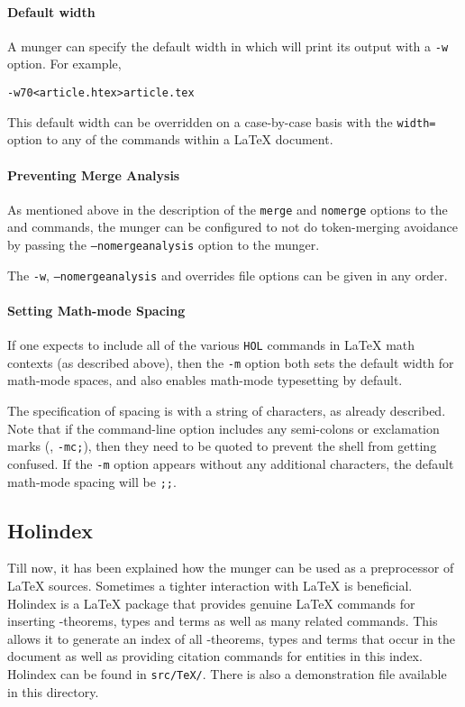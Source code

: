 \paragraph{Default width}
A munger can specify the default width in which \HOL{} will print its
output with a \texttt{-w} option.
%
For example,
\begin{alltt}
   \munge -w70 < article.htex > article.tex
\end{alltt}
This default width can be overridden on a case-by-case basis with the
\texttt{width=} option to any of the commands within a \LaTeX{}
document.

\paragraph{Preventing Merge Analysis}  As mentioned above in the description of the \texttt{merge} and \texttt{nomerge} options to the \holtm{} and \holthm{} commands, the munger can be configured to not do token-merging avoidance by passing the \texttt{--nomergeanalysis} option to the munger.

\smallskip \noindent The \texttt{-w}, \texttt{--nomergeanalysis} and
overrides file options can be given in any order.

\paragraph{Setting Math-mode Spacing} If one expects to include all of the various \texttt{\bs{}HOL} commands in \LaTeX{} math contexts (as described above), then the \texttt{-m} option both sets the default width for math-mode spaces, and also
enables math-mode typesetting by default.

The specification of spacing is with a string of characters, as already described.
Note that if the command-line option includes any semi-colons or exclamation marks (\eg, \texttt{-mc;}), then they need to be quoted to prevent the shell from getting confused.
If the \texttt{-m} option appears without any additional characters, the default math-mode spacing will be \texttt{\bs;\bs;}.


\subsection{Holindex}

Till now, it has been explained how the munger can be used as a preprocessor of \LaTeX{} sources.
Sometimes a tighter interaction with \LaTeX{} is beneficial.
Holindex is a \LaTeX{} package that provides genuine \LaTeX{} commands for inserting \HOL{}-theorems, types and terms as well as many related commands.
This allows it to generate an index of all \HOL{}-theorems, types and terms that occur in the document as well as providing citation commands for \HOL{} entities in this index.
Holindex can be found in \texttt{src/TeX/}.
There is also a demonstration file available in this directory.


